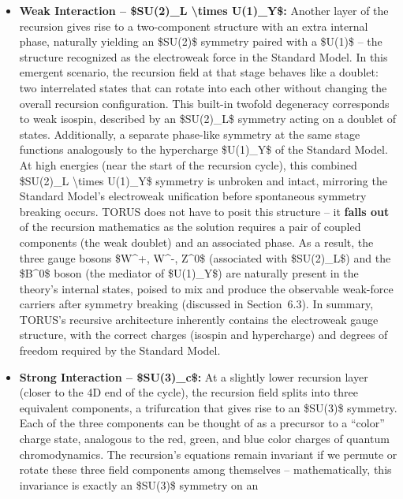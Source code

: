 \documentclass[
]{article}
\begin{document}
\begin{itemize}
\item
  \textbf{Weak Interaction -- \$SU(2)\_L \textbackslash times
  U(1)\_Y\$:} Another layer of the recursion gives rise to a
  two-component structure with an extra internal phase, naturally
  yielding an \$SU(2)\$ symmetry paired with a \$U(1)\$ -- the structure
  recognized as the electroweak force in the Standard Model. In this
  emergent scenario, the recursion field at that stage behaves like a
  doublet: two interrelated states that can rotate into each other
  without changing the overall recursion configuration. This built-in
  twofold degeneracy corresponds to weak isospin, described by an
  \$SU(2)\_L\$ symmetry acting on a doublet of states\hspace{0pt}.
  Additionally, a separate phase-like symmetry at the same stage
  functions analogously to the hypercharge \$U(1)\_Y\$ of the Standard
  Model. At high energies (near the start of the recursion cycle), this
  combined \$SU(2)\_L \textbackslash times U(1)\_Y\$ symmetry is
  unbroken and intact, mirroring the Standard Model's electroweak
  unification before spontaneous symmetry breaking occurs. TORUS does
  not have to posit this structure -- it \textbf{falls out} of the
  recursion mathematics as the solution requires a pair of coupled
  components (the weak doublet) and an associated phase. As a result,
  the three gauge bosons \$W\^{}+, W\^{}-, Z\^{}0\$ (associated with
  \$SU(2)\_L\$) and the \$B\^{}0\$ boson (the mediator of \$U(1)\_Y\$)
  are naturally present in the theory's internal states, poised to mix
  and produce the observable weak-force carriers after symmetry breaking
  (discussed in Section~6.3). In summary, TORUS's recursive architecture
  inherently contains the electroweak gauge structure, with the correct
  charges (isospin and hypercharge) and degrees of freedom required by
  the Standard Model.
\item
  \textbf{Strong Interaction -- \$SU(3)\_c\$:} At a slightly lower
  recursion layer (closer to the 4D end of the cycle), the recursion
  field splits into three equivalent components, a trifurcation that
  gives rise to an \$SU(3)\$ symmetry\hspace{0pt}. Each of the three
  components can be thought of as a precursor to a ``color'' charge
  state, analogous to the red, green, and blue color charges of quantum
  chromodynamics. The recursion's equations remain invariant if we
  permute or rotate these three field components among themselves --
  mathematically, this invariance is exactly an \$SU(3)\$ symmetry on an

\end{itemize}
\end{document}
